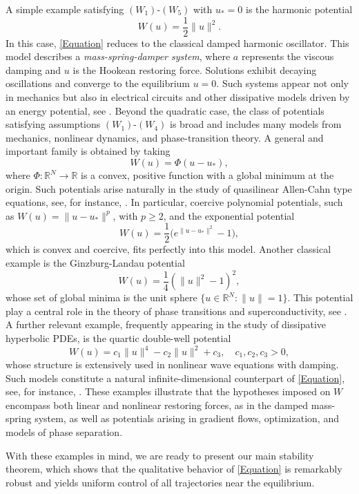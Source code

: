 \documentclass[12pt]{amsart}
\numberwithin{equation}{section}
\begin{document}
A simple example satisfying \hyperlink{W1}{$(W_1)$}-\hyperlink{W4}{$(W_5)$} with $u_*=0$ is the harmonic potential
$$
W(u)=\frac{1}{2}\|u\|^2.
$$
In this case, \eqref{Equation} reduces to the classical damped harmonic oscillator. This model describes a {\it mass-spring-damper system}, where $a$ represents the viscous damping and $u$ is the Hookean restoring force. Solutions exhibit decaying oscillations and converge to the equilibrium $u=0$. Such systems appear  not only in mechanics but also in electrical circuits and other dissipative models driven by an energy potential, see \cite{Edwards,Sunday1,Sunday2}. Beyond the quadratic case, the class of potentials satisfying assumptions \hyperlink{W1}{$(W_1)$}-\hyperlink{W4}{$(W_4)$} is broad and includes many models from mechanics, nonlinear dynamics, and phase-transition theory. A general and important family is obtained by taking  
$$
W(u)=\Phi(u-u_*),
$$
where $\Phi\colon\mathbb{R}^N\to\mathbb{R}$ is a convex, positive function with a global minimum at the origin. Such potentials arise naturally in the study of quasilinear Allen-Cahn type equations, see, for instance, \cite{Isneri}. In particular, coercive polynomial potentials, such as $W(u)=\|u-u_*\|^p$, with $p\ge 2$, and the exponential potential  
$$
W(u)=\frac12\big(e^{\|u-u_*\|^2}-1\big),
$$
which is convex and coercive, fits perfectly into this model. Another classical example is the Ginzburg-Landau potential  
$$
W(u)=\frac14\left(\|u\|^2-1\right)^2,
$$
whose set of global minima is the unit sphere $\{u\in\mathbb{R}^N : \|u\| = 1\}$. This potential play a central role in the theory of phase transitions and superconductivity, see \cite{Allen,5}. A further relevant example, frequently appearing in the study of dissipative hyperbolic PDEs, is the quartic double-well potential  
$$
W(u)=c_1\|u\|^{4}-c_2\|u\|^{2}+c_3,\quad c_1,c_2,c_3>0,
$$
whose structure is extensively used in nonlinear wave equations with damping. Such models constitute a natural infinite-dimensional counterpart of \eqref{Equation}, see, for instance, \cite{8}. These examples illustrate that the hypotheses imposed on $W$ encompass both linear and nonlinear restoring forces, as in the damped mass-spring system, as well as potentials arising in gradient flows, optimization, and models of phase separation.

With these examples in mind, we are ready to present our main stability theorem, which shows that the qualitative behavior of \eqref{Equation} is remarkably robust and yields uniform control of all trajectories near the equilibrium.
\end{document}
